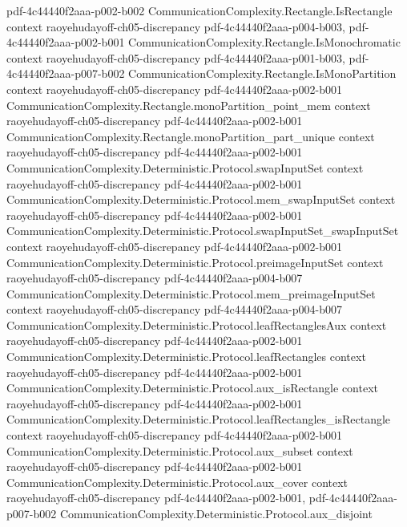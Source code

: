 \begin{theorem}
  {pdf-4c44440f2aaa-p002-b002}
\proofstep
  {CommunicationComplexity.Rectangle.IsRectangle}
  {context}
  {raoyehudayoff-ch05-discrepancy}
  {pdf-4c44440f2aaa-p004-b003,
    pdf-4c44440f2aaa-p002-b001}
\proofstep
  {CommunicationComplexity.Rectangle.IsMonochromatic}
  {context}
  {raoyehudayoff-ch05-discrepancy}
  {pdf-4c44440f2aaa-p001-b003,
    pdf-4c44440f2aaa-p007-b002}
\proofstep
  {CommunicationComplexity.Rectangle.IsMonoPartition}
  {context}
  {raoyehudayoff-ch05-discrepancy}
  {pdf-4c44440f2aaa-p002-b001}
\proofstep
  {CommunicationComplexity.Rectangle.monoPartition_point_mem}
  {context}
  {raoyehudayoff-ch05-discrepancy}
  {pdf-4c44440f2aaa-p002-b001}
\proofstep
  {CommunicationComplexity.Rectangle.monoPartition_part_unique}
  {context}
  {raoyehudayoff-ch05-discrepancy}
  {pdf-4c44440f2aaa-p002-b001}
\proofstep
  {CommunicationComplexity.Deterministic.Protocol.swapInputSet}
  {context}
  {raoyehudayoff-ch05-discrepancy}
  {pdf-4c44440f2aaa-p002-b001}
\proofstep
  {CommunicationComplexity.Deterministic.Protocol.mem_swapInputSet}
  {context}
  {raoyehudayoff-ch05-discrepancy}
  {pdf-4c44440f2aaa-p002-b001}
\proofstep
  {CommunicationComplexity.Deterministic.Protocol.swapInputSet_swapInputSet}
  {context}
  {raoyehudayoff-ch05-discrepancy}
  {pdf-4c44440f2aaa-p002-b001}
\proofstep
  {CommunicationComplexity.Deterministic.Protocol.preimageInputSet}
  {context}
  {raoyehudayoff-ch05-discrepancy}
  {pdf-4c44440f2aaa-p004-b007}
\proofstep
  {CommunicationComplexity.Deterministic.Protocol.mem_preimageInputSet}
  {context}
  {raoyehudayoff-ch05-discrepancy}
  {pdf-4c44440f2aaa-p004-b007}
\proofstep
  {CommunicationComplexity.Deterministic.Protocol.leafRectanglesAux}
  {context}
  {raoyehudayoff-ch05-discrepancy}
  {pdf-4c44440f2aaa-p002-b001}
\proofstep
  {CommunicationComplexity.Deterministic.Protocol.leafRectangles}
  {context}
  {raoyehudayoff-ch05-discrepancy}
  {pdf-4c44440f2aaa-p002-b001}
\proofstep
  {CommunicationComplexity.Deterministic.Protocol.aux_isRectangle}
  {context}
  {raoyehudayoff-ch05-discrepancy}
  {pdf-4c44440f2aaa-p002-b001}
\proofstep
  {CommunicationComplexity.Deterministic.Protocol.leafRectangles_isRectangle}
  {context}
  {raoyehudayoff-ch05-discrepancy}
  {pdf-4c44440f2aaa-p002-b001}
\proofstep
  {CommunicationComplexity.Deterministic.Protocol.aux_subset}
  {context}
  {raoyehudayoff-ch05-discrepancy}
  {pdf-4c44440f2aaa-p002-b001}
\proofstep
  {CommunicationComplexity.Deterministic.Protocol.aux_cover}
  {context}
  {raoyehudayoff-ch05-discrepancy}
  {pdf-4c44440f2aaa-p002-b001,
    pdf-4c44440f2aaa-p007-b002}
\proofstep
  {CommunicationComplexity.Deterministic.Protocol.aux_disjoint}

\end{theorem}

